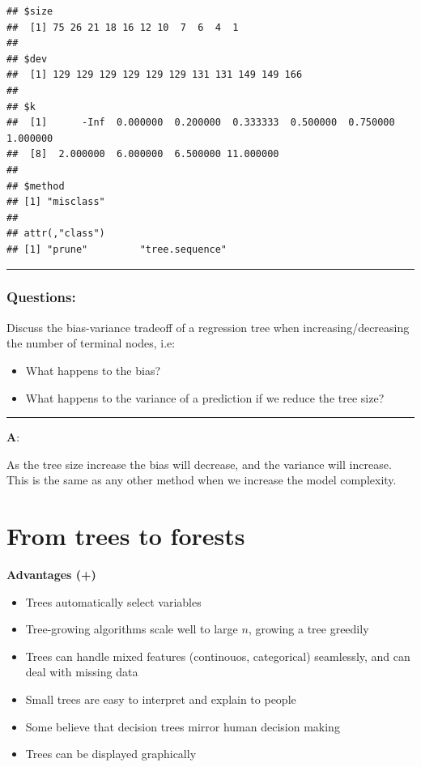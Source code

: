 \documentclass[]{article}
\providecommand{\tightlist}{%
  \setlength{\itemsep}{0pt}\setlength{\parskip}{0pt}}
\begin{document}
\begin{verbatim}
## $size
##  [1] 75 26 21 18 16 12 10  7  6  4  1
## 
## $dev
##  [1] 129 129 129 129 129 129 131 131 149 149 166
## 
## $k
##  [1]      -Inf  0.000000  0.200000  0.333333  0.500000  0.750000  1.000000
##  [8]  2.000000  6.000000  6.500000 11.000000
## 
## $method
## [1] "misclass"
## 
## attr(,"class")
## [1] "prune"         "tree.sequence"
\end{verbatim}

\begin{center}\rule{0.5\linewidth}{\linethickness}\end{center}

\hypertarget{questions-1}{%
\subsubsection{Questions:}\label{questions-1}}

Discuss the bias-variance tradeoff of a regression tree when
increasing/decreasing the number of terminal nodes, i.e:

\begin{itemize}
\tightlist
\item
  What happens to the bias?
\item
  What happens to the variance of a prediction if we reduce the tree
  size?
\end{itemize}

\begin{center}\rule{0.5\linewidth}{\linethickness}\end{center}

\textbf{A}:

As the tree size increase the bias will decrease, and the variance will
increase. This is the same as any other method when we increase the
model complexity.

\hypertarget{from-trees-to-forests}{%
\section{From trees to forests}\label{from-trees-to-forests}}

\textbf{Advantages (+)}

\begin{itemize}
\tightlist
\item
  Trees automatically select variables
\item
  Tree-growing algorithms scale well to large \(n\), growing a tree
  greedily
\item
  Trees can handle mixed features (continouos, categorical) seamlessly,
  and can deal with missing data
\item
  Small trees are easy to interpret and explain to people
\item
  Some believe that decision trees mirror human decision making
\item
  Trees can be displayed graphically
\end{itemize}
\end{document}
